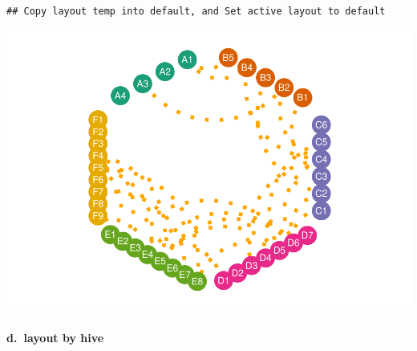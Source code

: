\documentclass[
]{article}
\let\oldparagraph\paragraph
\renewcommand{\paragraph}[1]{\oldparagraph{#1}\mbox{}}
\begin{document}
\begin{verbatim}
## Copy layout temp into default, and Set active layout to default
\end{verbatim}

\includegraphics{ReadMe_files/figure-latex/unnamed-chunk-13-1.pdf}

\hypertarget{d.-layout-by-hive}{%
\paragraph{d.~layout by hive}\label{d.-layout-by-hive}}
\end{document}
